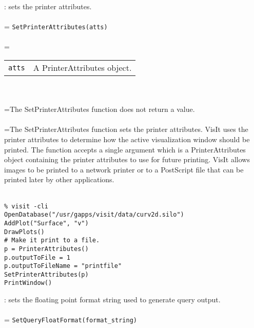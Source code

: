 \documentclass[10pt,a4paper]{report}
\begin{document}
{}
: sets the printer attributes.\\[-3mm]

 \\ 
\hangindent=\parindent 
\verb!SetPrinterAttributes(atts)!\\ [-3mm]

 \\ 
\hangindent=\parindent 
\begin{tabular}{ll}
\verb!atts! & A PrinterAttributes object. \\
\end{tabular} \\[-2mm]


 \\ 
\hangindent=\parindent The SetPrinterAttributes function does not return a value. \\[-3mm] 

 \\ 
\hangindent=\parindent The SetPrinterAttributes function sets the printer attributes. VisIt uses the printer attributes to determine how the active visualization window should be printed. The function accepts a single argument which is a PrinterAttributes object containing the printer attributes to use for future printing. VisIt allows images to be printed to a network printer or to a PostScript file that can be printed later by other applications. \\[-3mm] 

\\[-6mm]
\begin{verbatim}% visit -cli
OpenDatabase("/usr/gapps/visit/data/curv2d.silo")
AddPlot("Surface", "v")
DrawPlots()
# Make it print to a file.
p = PrinterAttributes()
p.outputToFile = 1
p.outputToFileName = "printfile"
SetPrinterAttributes(p)
PrintWindow()
\end{verbatim}
\newpage


{}
: sets the floating point format string used to generate query output.\\[-3mm]

 \\ 
\hangindent=\parindent 
\verb!SetQueryFloatFormat(format_string)!\\ [-3mm]
\end{document}
